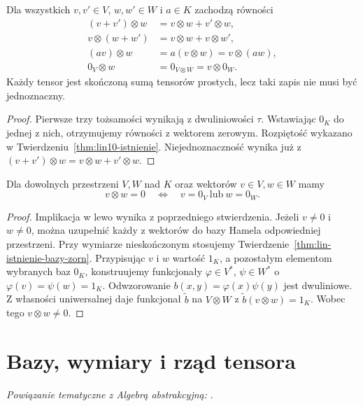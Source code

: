 \begin{stwierdzenie}
\label{prop:lin10-tozsamosci}
Dla wszystkich \(v,v'\in V\),
\(w,w'\in W\) i \(a\in K\)
zachodzą równości
\[
 \begin{aligned}
 (v+v')\otimes w&=v\otimes w+v'\otimes w,\\
 v\otimes(w+w')&=v\otimes w+v\otimes w',\\
 (av)\otimes w&=a(v\otimes w)=v\otimes(aw),\\
 0_V\otimes w&=0_{V\otimes W}=v\otimes0_W.
 \end{aligned}
\]
Każdy tensor jest skończoną sumą
tensorów prostych, lecz taki zapis
nie musi być jednoznaczny.
\end{stwierdzenie}
\begin{proof}
Pierwsze trzy tożsamości
wynikają z dwuliniowości \(\tau\).
Wstawiając \(0_K\) do jednej z nich,
otrzymujemy równości z wektorem
zerowym.
Rozpiętość wykazano w
Twierdzeniu~\ref{thm:lin10-istnienie}.
Niejednoznaczność wynika już z
\((v+v')\otimes w
=v\otimes w+v'\otimes w\).
\end{proof}

\begin{stwierdzenie}
\label{prop:lin10-zerowanie}
Dla dowolnych przestrzeni
\(V,W\) nad \(K\)
oraz wektorów \(v\in V,w\in W\)
mamy
\[
 v\otimes w=0\quad\Longleftrightarrow\quad
 v=0_V\ \text{lub}\ w=0_W.
\]
\end{stwierdzenie}
\begin{proof}
Implikacja w lewo wynika
z poprzedniego stwierdzenia.
Jeżeli \(v\ne0\) i \(w\ne0\),
można uzupełnić każdy z wektorów
do bazy Hamela odpowiedniej przestrzeni.
Przy wymiarze nieskończonym
stosujemy
Twierdzenie~\ref{thm:lin-istnienie-bazy-zorn}.
Przypisując \(v\) i \(w\)
wartość \(1_K\), a pozostałym
elementom wybranych baz \(0_K\),
konstruujemy funkcjonały
\(\varphi\in V^*\), \(\psi\in W^*\)
o \(\varphi(v)=\psi(w)=1_K\).
Odwzorowanie
\(b(x,y)=\varphi(x)\psi(y)\)
jest dwuliniowe.
Z własności uniwersalnej
daje funkcjonał \(\widetilde b\)
na \(V\otimes W\) z
\(\widetilde b(v\otimes w)=1_K\).
Wobec tego \(v\otimes w\ne0\).
\end{proof}

\section{Bazy, wymiary i rząd tensora}
\label{sec:lin10-bazy}

\noindent\emph{Powiązanie tematyczne z Algebrą abstrakcyjną:} .


